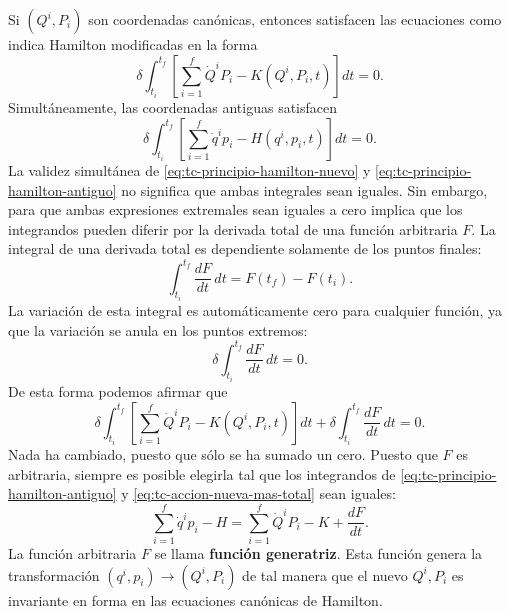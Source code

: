 \documentclass[../apunte_mecanica_clasica.tex]{subfiles}
\begin{document}
Si \((Q^i,P_i)\) son coordenadas canónicas, entonces satisfacen las ecuaciones como indica Hamilton modificadas en la forma
\begin{equation}
    \delta\int_{t_i}^{t_f}\left[
    \sum_{i=1}^{f}\dot Q^iP_i-K(Q^i,P_i,t)
    \right]dt=0.
    \label{eq:tc-principio-hamilton-nuevo}
\end{equation}
Simultáneamente, las coordenadas antiguas satisfacen
\begin{equation}
    \delta\int_{t_i}^{t_f}\left[
    \sum_{i=1}^{f}\dot q^i p_i-H(q^i,p_i,t)
    \right]dt=0.
    \label{eq:tc-principio-hamilton-antiguo}
\end{equation}
La validez simultánea de \eqref{eq:tc-principio-hamilton-nuevo} y \eqref{eq:tc-principio-hamilton-antiguo} no significa que ambas integrales sean iguales. Sin embargo, para que ambas expresiones extremales sean iguales a cero implica que los integrandos pueden diferir por la derivada total de una función arbitraria \(F\). La integral de una derivada total es dependiente solamente de los puntos finales:
\begin{equation}
    \int_{t_i}^{t_f}\frac{dF}{dt}\,dt=F(t_f)-F(t_i).
    \label{eq:tc-derivada-total}
\end{equation}
La variación de esta integral es automáticamente cero para cualquier función, ya que la variación se anula en los puntos extremos:
\begin{equation}
    \delta\int_{t_i}^{t_f}\frac{dF}{dt}\,dt=0.
    \label{eq:tc-variacion-derivada-total}
\end{equation}
De esta forma podemos afirmar que
\begin{equation}
    \delta\int_{t_i}^{t_f}\left[
    \sum_{i=1}^{f}\dot Q^iP_i-K(Q^i,P_i,t)
    \right]dt
    +
    \delta\int_{t_i}^{t_f}\frac{dF}{dt}\,dt=0.
    \label{eq:tc-accion-nueva-mas-total}
\end{equation}
Nada ha cambiado, puesto que sólo se ha sumado un cero. Puesto que \(F\) es arbitraria, siempre es posible elegirla tal que los integrandos de \eqref{eq:tc-principio-hamilton-antiguo} y \eqref{eq:tc-accion-nueva-mas-total} sean iguales:
\begin{equation}
    \sum_{i=1}^{f}\dot q^i p_i-H
    =
    \sum_{i=1}^{f}\dot Q^iP_i-K+\frac{dF}{dt}.
    \label{eq:tc-condicion-generatriz}
\end{equation}
La función arbitraria \(F\) se llama \textbf{función generatriz}. Esta función genera la transformación \((q^i,p_i)\to(Q^i,P_i)\) de tal manera que el nuevo \(Q^i,P_i\) es invariante en forma en las ecuaciones canónicas de Hamilton.
\end{document}
